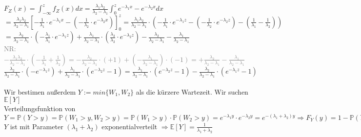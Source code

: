 \documentclass[a4paper]{article}
\begin{document}
\(F_Z(x)=\int^z_{-\infty}f_Z(x)dx=\frac{\lambda_1\lambda_2}{\lambda_2-\lambda_1}\int^z_0e^{-\lambda_1x}-e^{-\lambda_2x}dx\)\\
\(=\frac{\lambda_1\lambda_2}{\lambda_2-\lambda_1}\left[-\frac{1}{\lambda_1}\cdot e^{-\lambda_1x}-\left(-\frac{1}{\lambda_2}\cdot e^{-\lambda_2x}\right)\right]^z_0=\frac{\lambda_1\lambda_2}{\lambda_2-\lambda_1}\cdot\left(-\frac{1}{\lambda_1}\cdot e^{-\lambda_1z}-\left(-\frac{1}{\lambda_2}\cdot e^{-\lambda_2z}\right)-\left(\frac{1}{\lambda_1}-\frac{1}{\lambda_2}\right)\right)\)\\
\(=\frac{\lambda_2}{\lambda_2-\lambda_1}\cdot \left(-\frac{\lambda_1}{\lambda_1}\cdot e^{-\lambda_1z}\right)+\frac{\lambda_1}{\lambda_2-\lambda_1}\cdot \left(\frac{\lambda_2}{\lambda_2}\cdot e^{-\lambda_2z}\right)-\frac{\lambda_2}{\lambda_2-\lambda_1}-\frac{\lambda_1}{\lambda_2-\lambda_1}\)\\
\textcolor{gray}{NR: $-\frac{\lambda_1\lambda_2}{\lambda_2-\lambda_1}\cdot \left(-\frac{1}{\lambda_1}+\frac{1}{\lambda_2}\right)=-\frac{\lambda_2}{\lambda_2-\lambda_1}\cdot(+1)+\left(-\frac{\lambda_1}{\lambda_2-\lambda_1}\right)\cdot(-1)=+\frac{\lambda_2}{\lambda_2-\lambda_1}-\frac{\lambda_1}{\lambda_2-\lambda_1}$}\\
\(\frac{\lambda_2}{\lambda_2-\lambda_1}\cdot \left(-e^{-\lambda_1z}\right)+\frac{\lambda_1}{\lambda_2-\lambda_1}\cdot \left(e^{-\lambda_2z}-1\right)=\frac{\lambda_1}{\lambda_2-\lambda_1}\cdot\left(e^{-\lambda_2z}-1\right)-\frac{\lambda_2}{\lambda_2-\lambda_1}\cdot \left(e^{-\lambda_1z}-1\right)\)\\\\
Wir bestimen außerdem $Y:=min\{W_1,W_2\}$ als die kürzere Wartezeit. Wir suchen $\mathbb{E}[Y]$\\
Verteilungsfunktion von \(Y = \mathbb{P}(Y>y)=\mathbb{P}(W_1>y,W_2>y)=\mathbb{P}(W_1>y)\cdot \mathbb{P}(W_2>y)=e^{-\lambda_1y}\cdot e^{-\lambda_2y}=e^{-(\lambda_1+\lambda_2)y}\Rightarrow F_Y(y)=1-\mathbb{P}(Y>y)=1-e^{-(\lambda_1+\lambda_2)y}\)\\
$Y$ ist mit Parameter $(\lambda_1+\lambda_2)$ exponentialverteilt $\Rightarrow \mathbb{E}[Y]=\frac{1}{\lambda_1+\lambda_2}$
\end{document}
